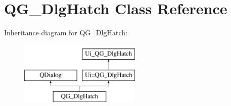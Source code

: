 \hypertarget{classQG__DlgHatch}{\section{Q\-G\-\_\-\-Dlg\-Hatch Class Reference}
\label{classQG__DlgHatch}
}
Inheritance diagram for Q\-G\-\_\-\-Dlg\-Hatch\-:\begin{figure}[H]
\begin{center}
\leavevmode
\includegraphics[height=3.000000cm]{classQG__DlgHatch}
\end{center}
\end{figure}

